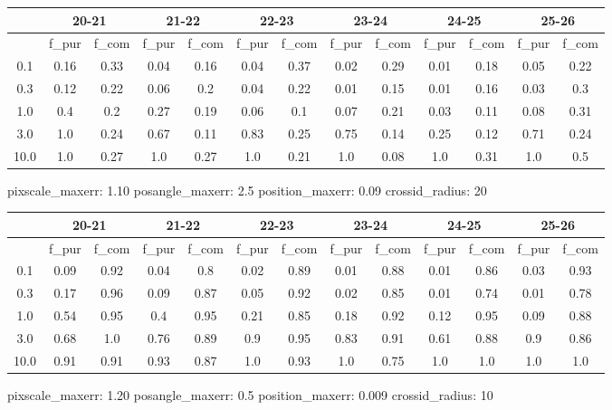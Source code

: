 \documentclass{article}
\begin{document}
\begin{figure}[H]
\centering
\begin{tabular}{|c|c|c|c|c|c|c|c|c|c|c|c|c|}
\hline
\multicolumn{1}{|c|}{} & \multicolumn{2}{|c|}{20-21} & \multicolumn{2}{|c|}{21-22} & \multicolumn{2}{|c|}{22-23} & \multicolumn{2}{|c|}{23-24} & \multicolumn{2}{|c|}{24-25} & \multicolumn{2}{|c|}{25-26}\\
\hline \hline
 & f\_pur & f\_com & f\_pur & f\_com & f\_pur & f\_com & f\_pur & f\_com & f\_pur & f\_com & f\_pur & f\_com \\
\hline
0.1 & 0.16 & 0.33 & 0.04 & 0.16 & 0.04 & 0.37 & 0.02 & 0.29 & 0.01 & 0.18 & 0.05 & 0.22\\
\hline
0.3 & 0.12 & 0.22 & 0.06 & 0.2 & 0.04 & 0.22 & 0.01 & 0.15 & 0.01 & 0.16 & 0.03 & 0.3\\
\hline
1.0 & 0.4 & 0.2 & 0.27 & 0.19 & 0.06 & 0.1 & 0.07 & 0.21 & 0.03 & 0.11 & 0.08 & 0.31\\
\hline
3.0 & 1.0 & 0.24 & 0.67 & 0.11 & 0.83 & 0.25 & 0.75 & 0.14 & 0.25 & 0.12 & 0.71 & 0.24\\
\hline
10.0 & 1.0 & 0.27 & 1.0 & 0.27 & 1.0 & 0.21 & 1.0 & 0.08 & 1.0 & 0.31 & 1.0 & 0.5\\
\hline
\end{tabular}
\caption{pixscale\_maxerr: 1.10 posangle\_maxerr: 2.5 position\_maxerr: 0.09 crossid\_radius: 20}
\end{figure}

\begin{figure}[H]
\centering
\begin{tabular}{|c|c|c|c|c|c|c|c|c|c|c|c|c|}
\hline
\multicolumn{1}{|c|}{} & \multicolumn{2}{|c|}{20-21} & \multicolumn{2}{|c|}{21-22} & \multicolumn{2}{|c|}{22-23} & \multicolumn{2}{|c|}{23-24} & \multicolumn{2}{|c|}{24-25} & \multicolumn{2}{|c|}{25-26}\\
\hline \hline
 & f\_pur & f\_com & f\_pur & f\_com & f\_pur & f\_com & f\_pur & f\_com & f\_pur & f\_com & f\_pur & f\_com \\
\hline
0.1 & 0.09 & 0.92 & 0.04 & 0.8 & 0.02 & 0.89 & 0.01 & 0.88 & 0.01 & 0.86 & 0.03 & 0.93\\
\hline
0.3 & 0.17 & 0.96 & 0.09 & 0.87 & 0.05 & 0.92 & 0.02 & 0.85 & 0.01 & 0.74 & 0.01 & 0.78\\
\hline
1.0 & 0.54 & 0.95 & 0.4 & 0.95 & 0.21 & 0.85 & 0.18 & 0.92 & 0.12 & 0.95 & 0.09 & 0.88\\
\hline
3.0 & 0.68 & 1.0 & 0.76 & 0.89 & 0.9 & 0.95 & 0.83 & 0.91 & 0.61 & 0.88 & 0.9 & 0.86\\
\hline
10.0 & 0.91 & 0.91 & 0.93 & 0.87 & 1.0 & 0.93 & 1.0 & 0.75 & 1.0 & 1.0 & 1.0 & 1.0\\
\hline
\end{tabular}
\caption{pixscale\_maxerr: 1.20 posangle\_maxerr: 0.5 position\_maxerr: 0.009 crossid\_radius: 10}
\end{figure}
\end{document}
